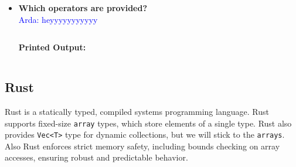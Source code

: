 \documentclass{article}
\newcommand{\arda}[1]{\textcolor{blue}{Arda: #1}}
\begin{document}
\begin{itemize}
\item \textbf{Which operators are provided?} \\
\arda{heyyyyyyyyyyy}
\begin{lstlisting}[language=Python]
\end{lstlisting}
\textbf{Printed Output:}
\begin{verbatim}
\end{verbatim}
\end{itemize}
\newpage




\subsection{Rust}
Rust is a statically typed, compiled systems programming language. Rust supports fixed-size \texttt{array} types, which store elements of a single type. Rust also provides \texttt{Vec<T>} type for dynamic collections, but we will stick to the \texttt{arrays}. Also Rust enforces strict memory safety, including bounds checking on array accesses, ensuring robust and predictable behavior.
\end{document}
